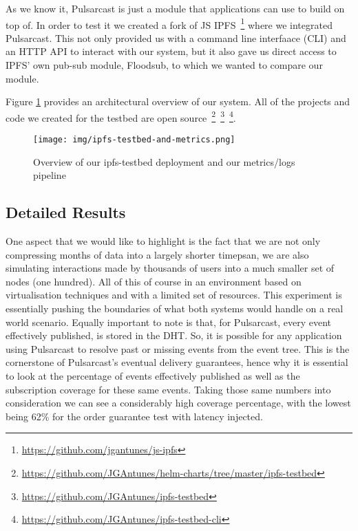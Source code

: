 As we know it, Pulsarcast is just a module that applications can use to build
on top of. In order to test it we created a fork of JS
IPFS~\footnote{\url{https://github.com/jgantunes/js-ipfs}} where we integrated
Pulsarcast. This not only provided us with a command line interfaace (CLI) and
an HTTP API to interact with our system, but it also gave us direct access to
IPFS' own pub-sub module, Floodsub, to which we wanted to compare our module.

Figure \ref{fig:ipfs-testbed-and-metrics} provides an architectural overview of
our system. All of the projects and code we created for the testbed are
open
source~\footnote{\url{https://github.com/JGAntunes/helm-charts/tree/master/ipfs-testbed}}~\footnote{\url{https://github.com/JGAntunes/ipfs-testbed}}~\footnote{\url{https://github.com/JGAntunes/ipfs-testbed-cli}}.

\begin{figure}[!htb]
  \centering
  \texttt{[image: img/ipfs-testbed-and-metrics.png]}
  \caption{Overview of our ipfs-testbed deployment and our metrics/logs
  pipeline}
  \label{fig:ipfs-testbed-and-metrics}
\end{figure}

\subsection{Detailed Results}
\label{ap:sub:detailed-results}

One aspect that we would like to highlight is the fact that we are not only
compressing months of data into a largely shorter timepsan, we are also
simulating interactions made by thousands of users into a much smaller set of
nodes (one hundred). All of this of course in an environment based on
virtualisation techniques and with a limited set of resources. This experiment
is essentially pushing the boundaries of what both systems would handle on a
real world scenario. Equally important to note is that, for Pulsarcast, every
event effectively published, is stored in the DHT. So, it is possible for any
application using Pulsarcast to resolve past or missing events from the event
tree. This is the cornerstone of Pulsarcast's eventual delivery guarantees,
hence why it is essential to look at the percentage of events effectively
published as well as the subscription coverage for these same events. Taking
those same numbers into consideration we can see a considerably high coverage
percentage, with the lowest being 62\% for the order guarantee test with
latency injected.

